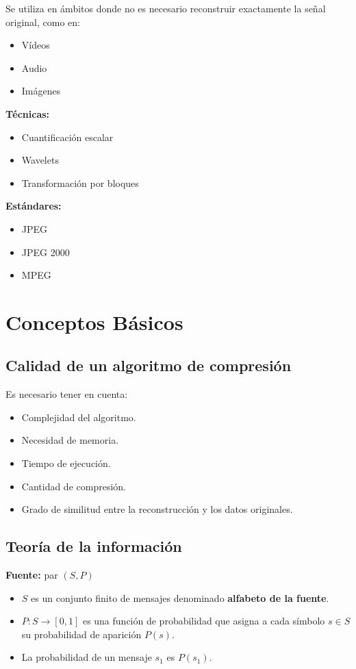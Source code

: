\documentclass[11pt,a4paper]{article}
\begin{document}
Se utiliza en ámbitos donde no es necesario reconstruir exactamente la señal original, como en:
\begin{itemize}
    \item Vídeos
    \item Audio
    \item Imágenes
\end{itemize}

\textbf{Técnicas:}
\begin{itemize}
    \item Cuantificación escalar
    \item Wavelets
    \item Transformación por bloques
\end{itemize}

\textbf{Estándares:}
\begin{itemize}
    \item JPEG
    \item JPEG 2000
    \item MPEG
\end{itemize}

\section{Conceptos Básicos}
\subsection{Calidad de un algoritmo de compresión}

Es necesario tener en cuenta:
\begin{itemize}
    \item Complejidad del algoritmo.
    \item Necesidad de memoria.
    \item Tiempo de ejecución.
    \item Cantidad de compresión.
    \item Grado de similitud entre la reconstrucción y los datos originales.
\end{itemize}

\subsection{Teoría de la información}

\begin{DefBox}
\textbf{Fuente:} par $(S, P)$

\begin{itemize}
    \item $S$ es un conjunto finito de mensajes denominado \textbf{alfabeto de la fuente}.
    \item $P : S \to [0,1]$ es una función de probabilidad que asigna a cada símbolo $s \in S$ su probabilidad de aparición $P(s)$.
    \item La probabilidad de un mensaje $s_1$ es $P(s_1)$.
\end{itemize}
\end{DefBox}
\end{document}
